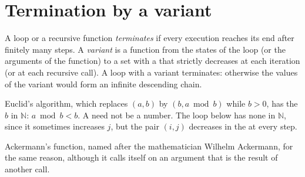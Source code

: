 \section{Termination by a variant}\label{sec:b1:induction-and-termination:variant}

\begin{definition}\label{def:b1:induction-and-termination:variant}
A loop or a recursive function \emph{terminates} if every execution reaches its end after finitely
many steps. A \emph{variant} is a function from the states of the loop (or the arguments
of the function) to a set with a  that strictly decreases at each iteration (or at each recursive
call). A loop with a variant terminates: otherwise the values of the variant would form an infinite descending chain.
\end{definition}

Euclid's algorithm, which replaces $(a, b)$ by $(b, a \bmod b)$ while $b > 0$, has the  $b$ in $\mathbb{N}$:
$a \bmod b < b$. A  need not be a number. The loop below has none in $\mathbb{N}$, since it sometimes increases
$j$, but the pair $(i, j)$ decreases in the  at every step.

\label{lst:b1:induction-and-termination:lex-loop}

\label{out:b1:induction-and-termination:lex-loop}

Ackermann's function, named after the mathematician Wilhelm Ackermann,  for the same reason, although it
calls itself on an argument that is the result of another call.

\label{lst:b1:induction-and-termination:ackermann}

\label{out:b1:induction-and-termination:ackermann}

